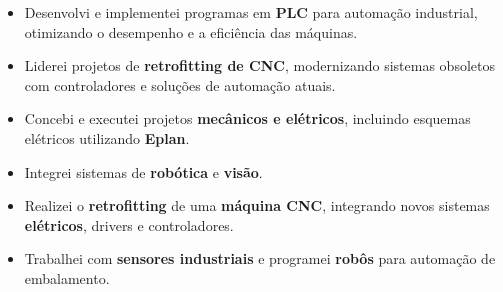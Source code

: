 \documentclass[10pt,a4paper]{altacv}
\begin{document}

\begin{fullwidth}
\makecvheader
\end{fullwidth}




\begin{itemize}
\item Desenvolvi e implementei programas em \textbf{PLC} para automação industrial, otimizando o desempenho e a eficiência das máquinas.  
\item Liderei projetos de \textbf{retrofitting de CNC}, modernizando sistemas obsoletos com controladores e soluções de automação atuais.  
\item Concebi e executei projetos \textbf{mecânicos e elétricos}, incluindo esquemas elétricos utilizando \textbf{Eplan}.  
\item Integrei sistemas de \textbf{robótica} e \textbf{visão}.
\end{itemize}

\medskip

\begin{itemize}
\item Realizei o \textbf{retrofitting} de uma \textbf{máquina CNC}, integrando novos sistemas \textbf{elétricos}, drivers e controladores.  
\item Trabalhei com \textbf{sensores industriais} e programei \textbf{robôs} para automação de embalamento.  
\end{itemize}
\end{document}
